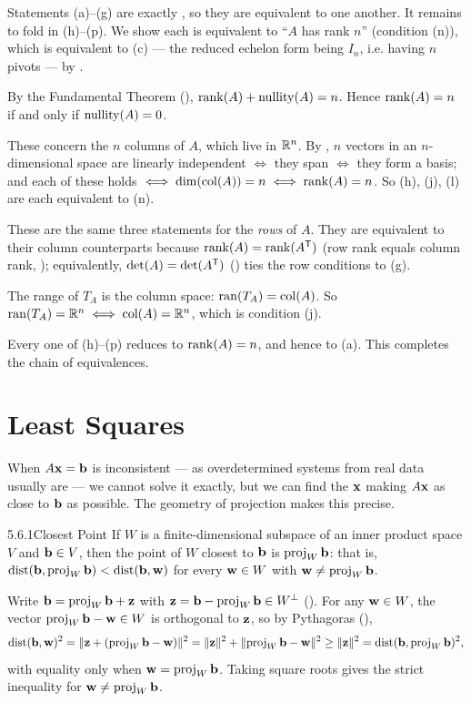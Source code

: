 \begin{prf}
Statements (a)--(g) are exactly , so they are equivalent to one another. It remains to fold in (h)--(p). We show each is equivalent to ``$A$ has rank $n$'' (condition (n)), which is equivalent to (c) --- the reduced echelon form being $I_n$, i.e. having $n$ pivots --- by .

 By the Fundamental Theorem (), $\operatorname{rank}(A)+\operatorname{nullity}(A)=n$. Hence $\operatorname{rank}(A)=n$ if and only if $\operatorname{nullity}(A)=0$.

 These concern the $n$ columns of $A$, which live in $\mathbb{R}^n$. By , $n$ vectors in an $n$-dimensional space are linearly independent $\iff$ they span $\iff$ they form a basis; and each of these holds $\iff\operatorname{dim}(\operatorname{col}(A))=n\iff\operatorname{rank}(A)=n$. So (h), (j), (l) are each equivalent to (n).

 These are the same three statements for the \emph{rows} of $A$. They are equivalent to their column counterparts because $\operatorname{rank}(A)=\operatorname{rank}(A^{\mathsf{T}})$ (row rank equals column rank, ); equivalently, $\det(A)=\det(A^{\mathsf{T}})$ () ties the row conditions to (g).

 The range of $T_A$ is the column space: $\operatorname{ran}(T_A)=\operatorname{col}(A)$. So $\operatorname{ran}(T_A)=\mathbb{R}^n\iff\operatorname{col}(A)=\mathbb{R}^n$, which is condition (j).

\noindent Every one of (h)--(p) reduces to $\operatorname{rank}(A)=n$, and hence to (a). This completes the chain of equivalences.
\end{prf}

\section{Least Squares}
\label{sec:5.6}

When $A\mathbf{x}=\mathbf{b}$ is inconsistent --- as overdetermined systems from real data usually are --- we cannot solve it exactly, but we can find the $\mathbf{x}$ making $A\mathbf{x}$ as close to $\mathbf{b}$ as possible. The geometry of projection makes this precise.

\begin{thms}{5.6.1}{Closest Point}
If $W$ is a finite-dimensional subspace of an inner product space $V$ and $\mathbf{b}\in V$, then the point of $W$ closest to $\mathbf{b}$ is $\operatorname{proj}_W\mathbf{b}$: that is, $\operatorname{dist}(\mathbf{b},\operatorname{proj}_W\mathbf{b})<\operatorname{dist}(\mathbf{b},\mathbf{w})$ for every $\mathbf{w}\in W$ with $\mathbf{w}\neq\operatorname{proj}_W\mathbf{b}$.
\end{thms}

\begin{prf}
Write $\mathbf{b}=\operatorname{proj}_W\mathbf{b}+\mathbf{z}$ with $\mathbf{z}=\mathbf{b}-\operatorname{proj}_W\mathbf{b}\in W^\perp$ (). For any $\mathbf{w}\in W$, the vector $\operatorname{proj}_W\mathbf{b}-\mathbf{w}\in W$ is orthogonal to $\mathbf{z}$, so by Pythagoras (),
\[
\operatorname{dist}(\mathbf{b},\mathbf{w})^2=\lVert \mathbf{z}+(\operatorname{proj}_W\mathbf{b}-\mathbf{w}) \rVert^2=\lVert \mathbf{z} \rVert^2+\lVert \operatorname{proj}_W\mathbf{b}-\mathbf{w} \rVert^2\ge\lVert \mathbf{z} \rVert^2=\operatorname{dist}(\mathbf{b},\operatorname{proj}_W\mathbf{b})^2,
\]
with equality only when $\mathbf{w}=\operatorname{proj}_W\mathbf{b}$. Taking square roots gives the strict inequality for $\mathbf{w}\neq\operatorname{proj}_W\mathbf{b}$.
\end{prf}

